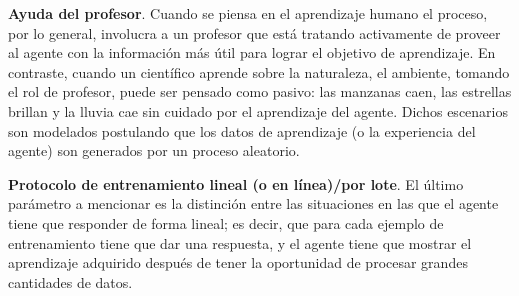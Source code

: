 \textbf{Ayuda del profesor}. Cuando se piensa en el aprendizaje humano
el proceso, por lo general, involucra a un profesor que está tratando
activamente de proveer al agente con la información más útil para
lograr el objetivo de aprendizaje. En contraste, cuando un científico
aprende sobre la naturaleza, el ambiente, tomando el rol de profesor,
puede ser pensado como pasivo: las manzanas caen, las estrellas
brillan y la lluvia cae sin cuidado por el aprendizaje del agente.
Dichos escenarios son modelados postulando que los datos de
aprendizaje (o la experiencia del agente) son generados por un proceso
aleatorio.

\textbf{Protocolo de entrenamiento lineal (o en línea)/por lote}. El
último parámetro a mencionar es la distinción entre las situaciones en
las que el agente tiene que responder de forma lineal; es decir, que
para cada ejemplo de entrenamiento tiene que dar una respuesta, y
el agente tiene que mostrar el aprendizaje adquirido después de
tener la oportunidad de procesar grandes cantidades de datos.
